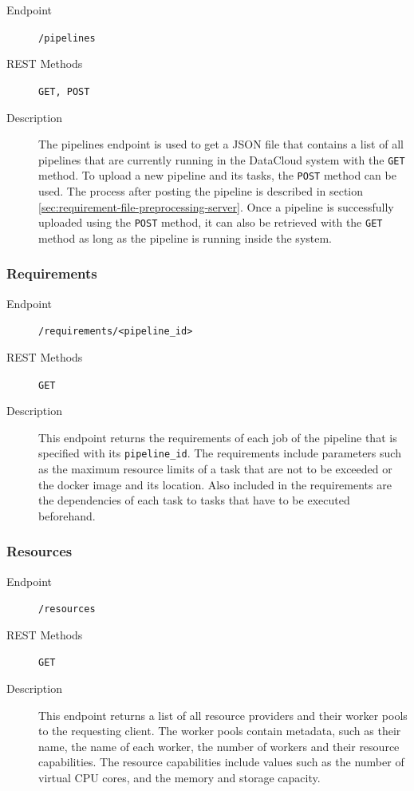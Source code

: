 \documentclass{article}
\begin{document}
                \begin{description}
                    \item[Endpoint] \texttt{/pipelines}
                    \item[REST Methods] \texttt{GET, POST}
                    \item[Description] The pipelines endpoint is used to get a JSON file that contains a list of all pipelines that are currently running in the DataCloud system with the \texttt{GET} method. To upload a new pipeline and its tasks, the \texttt{POST} method can be used. The process after posting the pipeline is described in section \ref{sec:requirement-file-preprocessing-server}. Once a pipeline is successfully uploaded using the \texttt{POST} method, it can also be retrieved with the \texttt{GET} method as long as the pipeline is running inside the system.
                \end{description}

                
            \subsubsection{Requirements}

            \begin{description}
                \item[Endpoint] \texttt{/requirements/<pipeline\_id>}
                \item[REST Methods] \texttt{GET}
                \item[Description] This endpoint returns the requirements of each job of the pipeline that is specified with its \texttt{pipeline\_id}. The requirements include parameters such as the maximum resource limits of a task that are not to be exceeded or the docker image and its location. Also included in the requirements are the dependencies of each task to tasks that have to be executed beforehand.
            \end{description}
                
            \subsubsection{Resources}

            \begin{description}
                \item[Endpoint] \texttt{/resources}
                \item[REST Methods] \texttt{GET}
                \item[Description] This endpoint returns a list of all resource providers and their worker pools to the requesting client. The worker pools contain metadata, such as their name, the name of each worker, the number of workers and their resource capabilities. The resource capabilities include values such as the number of virtual CPU cores, and the memory and storage capacity.
            \end{description}
\end{document}
